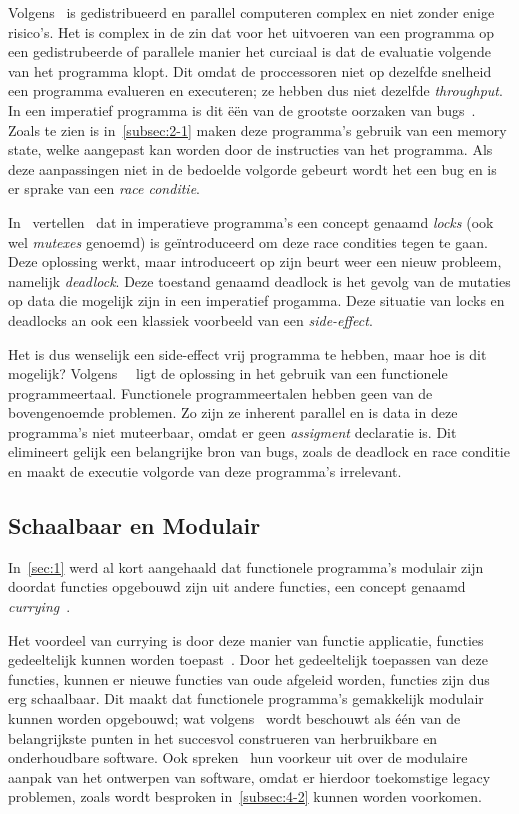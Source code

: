 \documentclass[twoside,twocolumn]{article}
\begin{document}
Volgens~\textcites{src13} is gedistribueerd en parallel computeren
complex en niet zonder enige risico's. Het is complex in de zin dat voor het
uitvoeren van een programma op een gedistrubeerde of parallele manier het
curciaal is dat de evaluatie volgende van het programma klopt. Dit omdat de
proccessoren niet op dezelfde snelheid een programma evalueren en executeren;
ze hebben dus niet dezelfde \textit{throughput}. In een imperatief programma is
dit \"e\"en van de grootste oorzaken van bugs~\cite{src1}. Zoals te zien is
in~\cref{subsec:2-1} maken deze programma's gebruik van een memory state, welke
aangepast kan worden door de instructies van het programma. Als deze
aanpassingen niet in de bedoelde volgorde gebeurt wordt het een bug en is er
sprake van een \textit{race conditie}.

In~ vertellen~\citeauthor{src14} dat in imperatieve
programma's een concept genaamd \textit{locks} (ook wel \textit{mutexes}
genoemd) is ge\"introduceerd om deze race condities tegen te gaan. Deze
oplossing werkt, maar introduceert op zijn beurt weer een nieuw
probleem, namelijk \textit{deadlock}. Deze toestand genaamd deadlock is het
gevolg van de mutaties op data die mogelijk zijn in een imperatief progamma.
Deze situatie van locks en deadlocks an ook een klassiek voorbeeld van een
\textit{side-effect}.

Het is dus wenselijk een side-effect vrij programma te hebben, maar hoe is dit
mogelijk? Volgens~\citeauthor{src14}~\cite{src14,src15} ligt de oplossing in
het gebruik van een functionele programmeertaal. Functionele programmeertalen
hebben geen van de bovengenoemde problemen. Zo zijn ze inherent parallel en is
data in deze programma's niet muteerbaar, omdat er geen \textit{assigment}
declaratie is. Dit elimineert gelijk een belangrijke bron van bugs, zoals de
deadlock en race conditie en maakt de executie volgorde van deze programma's
irrelevant.

\subsection{Schaalbaar en Modulair}
\label{subsec:3-2}

In~\cref{sec:1} werd al kort aangehaald dat functionele programma's modulair
zijn doordat functies opgebouwd zijn uit andere functies, een concept genaamd
\textit{currying}~\cite[hfdst.~5]{src16}.

Het voordeel van currying is door deze manier van functie applicatie, functies
gedeeltelijk kunnen worden toepast~\cite{src1}. Door het gedeeltelijk
toepassen van deze functies, kunnen er nieuwe functies van oude afgeleid
worden, functies zijn dus erg schaalbaar. Dit maakt dat functionele programma's
gemakkelijk modulair kunnen worden opgebouwd; wat volgens~\textcite{src17}
wordt beschouwt als \'e\'en van de belangrijkste punten in het succesvol
construeren van herbruikbare en onderhoudbare software. Ook
spreken~\textcite{src18} hun voorkeur uit over de modulaire aanpak van het
ontwerpen van software, omdat er hierdoor toekomstige legacy problemen,
zoals wordt besproken in~\cref{subsec:4-2} kunnen worden voorkomen.
\end{document}
